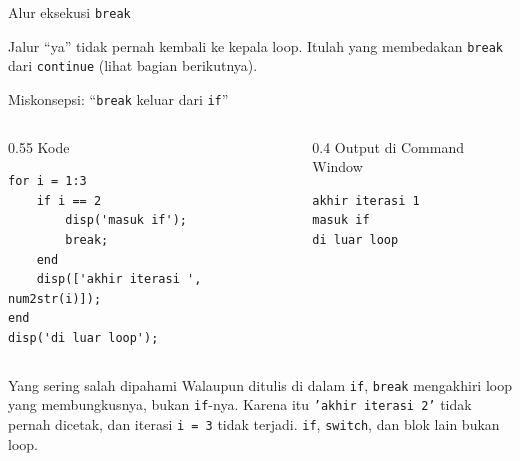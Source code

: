 \documentclass[aspectratio=169,10pt]{beamer}
\newcommand{\kode}[1]{\texttt{#1}}
\newcommand{\labelkode}{{\scriptsize\color{black!60}Kode}}
\newcommand{\labelout}{{\scriptsize\color{alertc}Output di Command Window}}
\begin{document}
\begin{frame}[fragile]{Alur eksekusi \kode{break}}
  \centering

  \vspace{8pt}
  \raggedright
  Jalur ``ya'' \alert{tidak pernah kembali} ke kepala loop. Itulah yang membedakan \kode{break} dari
  \kode{continue} (lihat bagian berikutnya).
\end{frame}

\begin{frame}[fragile]{Miskonsepsi: ``\kode{break} keluar dari \kode{if}''}
  \begin{columns}[T]
    \begin{column}{0.55\textwidth}
      \labelkode
\begin{lstlisting}
for i = 1:3
    if i == 2
        disp('masuk if');
        break;
    end
    disp(['akhir iterasi ', num2str(i)]);
end
disp('di luar loop');
\end{lstlisting}
    \end{column}
    \begin{column}{0.4\textwidth}
      \labelout
\begin{lstlisting}[style=out]
akhir iterasi 1
masuk if
di luar loop
\end{lstlisting}
    \end{column}
  \end{columns}
  \vspace{6pt}
  \begin{alertblock}{Yang sering salah dipahami}
    Walaupun ditulis di dalam \kode{if}, \kode{break} mengakhiri \alert{loop} yang membungkusnya, bukan
    \kode{if}-nya. Karena itu \kode{'akhir iterasi 2'} tidak pernah dicetak, dan iterasi \kode{i = 3}
    tidak terjadi. \kode{if}, \kode{switch}, dan blok lain \alert{bukan} loop.
  \end{alertblock}
\end{frame}
\end{document}
